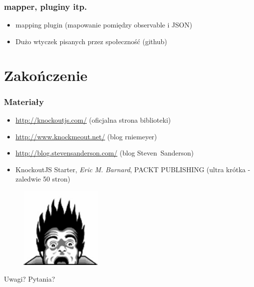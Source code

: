 \documentclass{beamer}
\begin{document}
\begin{frame}
	\frametitle{mapper, pluginy itp.}
	
	\begin{itemize}
		\item
			mapping plugin (mapowanie pomiędzy observable i JSON)
		\item
			Dużo wtyczek pisanych przez społeczność (github)
	\end{itemize}
\end{frame}


\section{Zakończenie}

\begin{frame}
	\frametitle{Materiały}
	\begin{itemize}
		\item
			\url{http://knockoutjs.com/} (oficjalna strona biblioteki)
		\item
			\url{http://www.knockmeout.net/} (blog rniemeyer)
		\item
			\url{http://blog.stevensanderson.com/} (blog Steven~Sanderson)
		\item
			KnockoutJS Starter, \textit{Eric M. Barnard}, PACKT PUBLISHING 
			(ultra krótka - zaledwie 50 stron)
	\end{itemize}
\end{frame}


\begin{frame}
	\begin{figure}
		\centering
		\includegraphics[width=4cm]{img/coding_horror}
	\end{figure}
	\Huge{\centerline{Uwagi? Pytania?}}
\end{frame}

\end{document}
